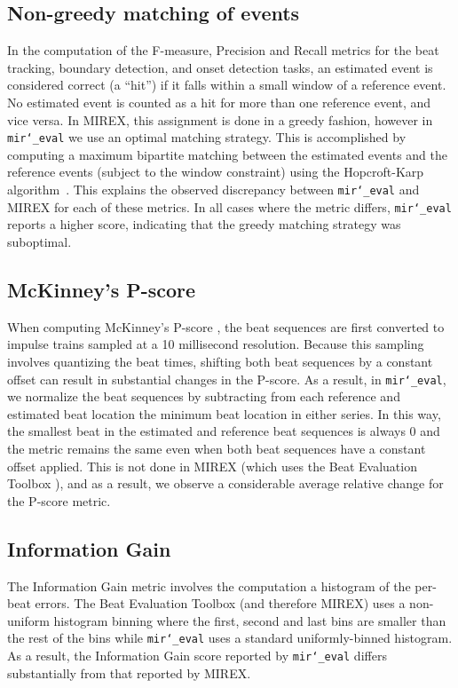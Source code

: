 \documentclass{article}
\def\mireval{\texttt{mir\char`_eval}}
\begin{document}
\subsection{Non-greedy matching of events}

In the computation of the F-measure, Precision and Recall metrics for the beat tracking, boundary detection, and onset detection tasks, an estimated event is considered correct (a ``hit'') if it falls within a small window of a reference event.
No estimated event is counted as a hit for more than one reference event, and vice versa.
In MIREX, this assignment is done in a greedy fashion, however in \mireval{} we use an optimal matching strategy.
This is accomplished by computing a maximum bipartite matching between the estimated events and the reference events (subject to the window constraint) using the Hopcroft-Karp algorithm~\cite{hopcroft1973n}.
This explains the observed discrepancy between \mireval{} and MIREX for each of these metrics.
In all cases where the metric differs, \mireval{} reports a higher score, indicating that the greedy matching strategy was suboptimal.

\subsection{McKinney's P-score}

When computing McKinney's P-score \cite{davies2009evaluation}, the beat sequences are first converted to impulse trains sampled at a 10 millisecond resolution.
Because this sampling involves quantizing the beat times, shifting both beat sequences by a constant offset can result in substantial changes in the P-score.
As a result, in \mireval{}, we normalize the beat sequences by subtracting from each reference and estimated beat location the minimum beat location in either series.
In this way, the smallest beat in the estimated and reference beat sequences is always $0$ and the metric remains the same even when both beat sequences have a constant offset applied.
This is not done in MIREX (which uses the Beat Evaluation Toolbox \cite{davies2009evaluation}), and as a result, we observe a considerable average relative change for the P-score metric.

\subsection{Information Gain}

The Information Gain metric \cite{davies2009evaluation} involves the computation a histogram of the per-beat errors.
The Beat Evaluation Toolbox (and therefore MIREX) uses a non-uniform histogram binning where the first, second and last bins are smaller than the rest of the bins while \mireval{} uses a standard uniformly-binned histogram.
As a result, the Information Gain score reported by \mireval{} differs substantially from that reported by MIREX.
\end{document}
